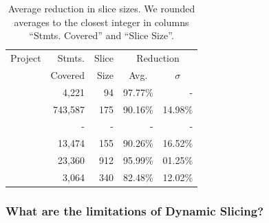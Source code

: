 \documentclass[sigplan,10pt,review,anonymous]{acmart}\settopmatter{printfolios=true,printccs=false,printacmref=false}
\begin{document}
\begin{table}[h]
  \centering
  \setlength{\tabcolsep}{3pt}
    \begin{tabular}{lrrrr}
      \toprule
      Project             & Stmts. & Slice &
      \multicolumn{2}{c}{Reduction} \\
      \cline{4-5}
                          &  Covered &  Size  & \multicolumn{1}{c}{Avg.} & \multicolumn{1}{c}{$\sigma$}\\
      \midrule
      \lang{}             & 4,221             & 94            &  97.77\%  & -       \\
      \cmath{}            & 743,587           & 175           &  90.16\%  & 14.98\% \\
      \closure{}          & -                 & -             &  -        & -       \\
      \chart{}            & 13,474            & 155           &  90.26\%  & 16.52\% \\
      \jtime{}            & 23,360            & 912           &  95.99\%  & 01.25\% \\
      \mockito{}          & 3,064             & 340           &  82.48\%  & 12.02\% \\
      \bottomrule
  \end{tabular}
\caption {\label{fig:ds-reduction}Average reduction in slice sizes. We
  rounded averages to the closest integer in columns
  ``Stmts. Covered'' and ``Slice Size''.}
\end{table}
\normalsize

\subsubsection{What are the limitations of Dynamic Slicing?}
\label{sec:ds-limitations}

\end{document}
